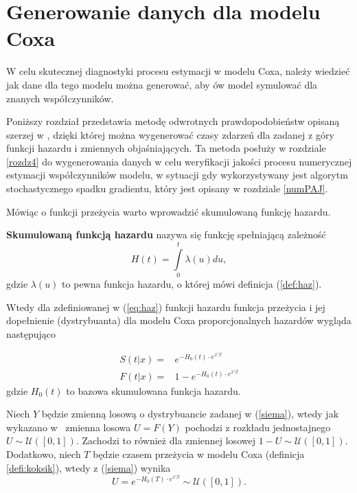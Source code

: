 \newpage

\section{Generowanie danych dla modelu Coxa}

W celu skutecznej diagnostyki procesu estymacji w modelu Coxa, należy wiedzieć jak dane dla tego modelu można generować, aby ów model symulować dla znanych współczynników.

Poniższy rozdział przedstawia metodę odwrotnych prawdopodobieństw opisaną szerzej w \cite{bender}, dzięki której można wygenerować czasy zdarzeń dla zadanej z góry funkcji hazardu i zmiennych objaśniających. Ta metoda posłuży w rozdziale \ref{rozdz4} do wygenerowania danych w celu weryfikacji jakości procesu numerycznej estymacji współczynników modelu, w sytuacji gdy wykorzystywany jest algorytm stochastycznego spadku gradientu, który jest opisany w rozdziale \ref{numPAJ}.

Mówiąc o funkcji przeżycia warto wprowadzić skumulowaną funkcję hazardu.
\begin{definition}
\textbf{Skumulowaną funkcją hazardu} nazywa się funkcję spełniającą zależność
\begin{equation}\label{zaradzix}
H(t) = \int\limits_{0}^{t}\lambda(u) du,
\end{equation}
gdzie $\lambda(u)$ to pewna funkcja hazardu, o której mówi definicja (\ref{def:haz}).
\end{definition}

Wtedy dla zdefiniowanej w (\ref{eq:haz}) funkcji hazardu funkcja przeżycia i jej dopełnienie (dystrybuanta) dla modelu Coxa proporcjonalnych hazardów wygląda następująco

\begin{align}
S(t|x)= & e^{-H_0(t)\cdot e^{x'\beta}} \\ 
F(t|x) = & 1 - e^{-H_0(t)\cdot e^{x'\beta}}\label{siema}
\end{align}
gdzie $H_0(t)$ to bazowa skumulowana funkcja hazardu.

Niech $Y$ będzie zmienną losową o dystrybuancie zadanej w (\ref{siema}), wtedy jak wykazano w~\cite{MOOD} zmienna losowa $U=F(Y)$ pochodzi z rozkładu jednostajnego $U \sim \mathcal{U}([0,1])$. Zachodzi to również dla zmiennej losowej $1-U \sim \mathcal{U}([0,1])$. Dodatkowo, niech $T$ będzie czasem przeżycia w modelu Coxa (definicja \ref{defi:koksik}), wtedy z (\ref{siema}) wynika
\begin{equation}
U = e^{-H_0(T)\cdot e^{x'\beta}} \sim \mathcal{U}([0,1]).
\end{equation}

